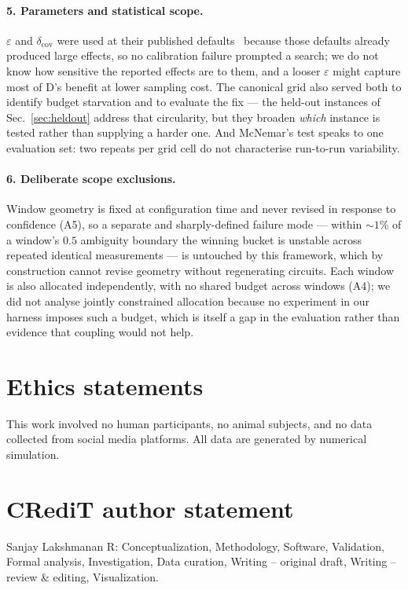 \documentclass[preprint,11pt]{elsarticle}
\newcommand{\dcov}{\delta_{\mathrm{cov}}}
\begin{document}
\paragraph{5. Parameters and statistical scope.}
$\varepsilon$ and $\dcov$ were used at their published
defaults~\cite{methodpaper} because those defaults already produced large
effects, so no calibration failure prompted a search; we do not know how
sensitive the reported effects are to them, and a looser $\varepsilon$
might capture most of D's benefit at lower sampling cost. The canonical
grid also served both to identify budget starvation and to evaluate the
fix --- the held-out instances of Sec.~\ref{sec:heldout} address that
circularity, but they broaden \emph{which} instance is tested rather than
supplying a harder one. And McNemar's test speaks to one evaluation set:
two repeats per grid cell do not characterise run-to-run variability.

\paragraph{6. Deliberate scope exclusions.}
Window geometry is fixed at configuration time and never revised in
response to confidence (A5), so a separate and sharply-defined failure
mode --- within ${\sim}1\%$ of a window's $0.5$ ambiguity boundary the
winning bucket is unstable across repeated identical measurements --- is
untouched by this framework, which by construction cannot revise geometry
without regenerating circuits. Each window is also allocated
independently, with no shared budget across windows (A4); we did not
analyse jointly constrained allocation because no experiment in our
harness imposes such a budget, which is itself a gap in the evaluation
rather than evidence that coupling would not help.

\section*{Ethics statements}
This work involved no human participants, no animal subjects, and no data
collected from social media platforms. All data are generated by numerical
simulation.

\section*{CRediT author statement}
\noindent
Sanjay Lakshmanan R: Conceptualization, Methodology, Software, Validation,
Formal analysis, Investigation, Data curation, Writing -- original draft,
Writing -- review \& editing, Visualization.
\end{document}
